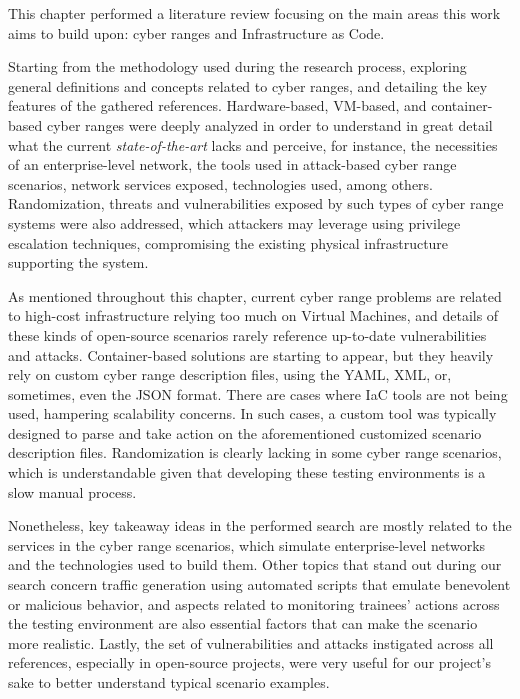 This chapter performed a literature review focusing on the main areas this work aims to build upon: cyber ranges and Infrastructure as Code. 

Starting from the methodology used during the research process, exploring general definitions and concepts related to cyber ranges, and detailing the key features of the gathered references. Hardware-based, VM-based, and container-based cyber ranges were deeply analyzed in order to understand in great detail what the current \textit{state-of-the-art} lacks and perceive, for instance, the necessities of an enterprise-level network, the tools used in attack-based cyber range scenarios, network services exposed, technologies used, among others. Randomization, threats and vulnerabilities exposed by such types of cyber range systems were also addressed, which attackers may leverage using privilege escalation techniques, compromising the existing physical infrastructure supporting the system. 

As mentioned throughout this chapter, current cyber range problems are related to high-cost infrastructure relying too much on Virtual Machines, and details of these kinds of open-source scenarios rarely reference up-to-date vulnerabilities and attacks. Container-based solutions are starting to appear, but they heavily rely on custom cyber range description files, using the YAML, XML, or, sometimes, even the JSON format. There are cases where IaC tools are not being used, hampering scalability concerns. In such cases, a custom tool was typically designed to parse and take action on the aforementioned customized scenario description files. Randomization is clearly lacking in some cyber range scenarios, which is understandable given that developing these testing environments is a slow manual process.

Nonetheless, key takeaway ideas in the performed search are mostly related to the services in the cyber range scenarios, which simulate enterprise-level networks and the technologies used to build them. Other topics that stand out during our search concern traffic generation using automated scripts that emulate benevolent or malicious behavior, and aspects related to monitoring trainees' actions across the testing environment are also essential factors that can make the scenario more realistic. Lastly, the set of vulnerabilities and attacks instigated across all references, especially in open-source projects, were very useful for our project's sake to better understand typical scenario examples.

